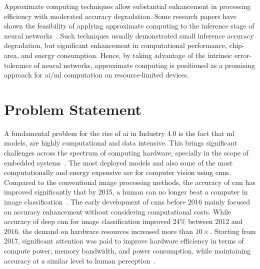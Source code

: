 Approximate computing techniques allow substantial enhancement in processing efficiency with moderated accuracy degradation. Some research papers have shown the feasibility of applying approximate computing to the inference stage of neural networks~\cite{lotrivc2012applicability, han2013approximate, du2014leveraging, mrazek2016design, sarwar2016multiplier, zervakis2021approximate}. Such techniques usually demonstrated small inference accuracy degradation, but significant enhancement in computational performance, chip-area, and energy consumption. Hence, by taking advantage of the intrinsic error-tolerance of neural networks, approximate computing is positioned as a promising approach for \gls{ai}/\gls{ml} computation on resource-limited devices.

\section{Problem Statement}
A fundamental problem for the rise of \gls{ai} in Industry 4.0 is the fact that \gls{ml} models, are highly computational and data intensive. This brings significant challenges across the spectrum of computing hardware, specially in the scope of embedded systems~\cite{venkataramani2016efficient}. The most deployed models and also some of the most computationally and energy expensive are for computer vision using \glspl{cnn}. Compared to the conventional image processing methods, the accuracy of \gls{cnn} has improved significantly that by 2015, a human can no longer beat a computer in image classification~\cite{loh20201}. The early development of \glspl{cnn} before 2016 mainly focused on accuracy enhancement without considering computational costs. While accuracy of deep \gls{cnn} for image classification improved 24\% between 2012 and 2016, the demand on hardware resources increased more than $10\times$. Starting from 2017, significant attention was paid to improve hardware efficiency in terms of compute power, memory bandwidth, and power consumption, while maintaining accuracy at a similar level to human perception~\cite{venkataramani2016efficient}.

